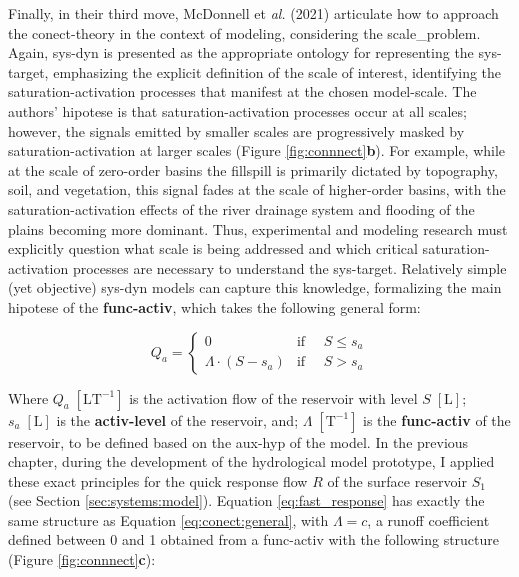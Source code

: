 \documentclass[./main_en.tex]{subfiles}
\begin{document}
\par Finally, in their third move, McDonnell et \textit{al.} (2021) articulate how to approach the \gls{conect-theory} in the context of modeling, considering the \gls{scale_problem}. Again, \gls{sys-dyn} is presented as the appropriate ontology for representing the \gls{sys-target}, emphasizing the explicit definition of the scale of interest, identifying the saturation-activation processes that manifest at the chosen \gls{model-scale}. The authors' \gls{hipotese} is that saturation-activation processes occur at all scales; however, the signals emitted by smaller scales are progressively masked by saturation-activation at larger scales (Figure \ref{fig:connnect}\textbf{b}). For example, while at the scale of zero-order basins the \gls{fillspill} is primarily dictated by topography, soil, and vegetation, this signal fades at the scale of higher-order basins, with the saturation-activation effects of the river drainage \gls{system} and flooding of the plains becoming more dominant. Thus, experimental and modeling research must explicitly question what scale is being addressed and which critical saturation-activation processes are necessary to understand the \gls{sys-target}. Relatively simple (yet objective) \gls{sys-dyn} models can capture this knowledge, formalizing the main \gls{hipotese} of the \textbf{\gls{func-activ}}, which takes the following general form:
\begin{linenomath*}
\begin{equation}
\label{eq:conect:general}
Q_a = 
\begin{cases} 
    0 & \text{if } \quad S \leq s_a\\
    \Lambda \cdot (S - s_a) & \text{if } \quad S > s_a
\end{cases}
\end{equation}
\end{linenomath*}
Where $Q_a\;[\text{L}\text{T}^{-1}]$ is the activation flow of the reservoir with level $S\;[\text{L}]$; $s_{a}\;[\text{L}]$ is the \textbf{\gls{activ-level}} of the reservoir, and; $\Lambda \;[\text{T}^{-1}]$ is the \textbf{\gls{func-activ}} of the reservoir, to be defined based on the \gls{aux-hyp} of the \gls{model}. In the previous chapter, during the development of the hydrological \gls{model} prototype, I applied these exact principles for the quick response flow $R$ of the surface reservoir $S_1$ (see Section \ref{sec:systems:model}). Equation \eqref{eq:fast_response} has exactly the same structure as Equation \eqref{eq:conect:general}, with $\Lambda = c$, a runoff coefficient defined between 0 and 1 obtained from a \gls{func-activ} with the following structure (Figure \ref{fig:connnect}\textbf{c}):
\end{document}
